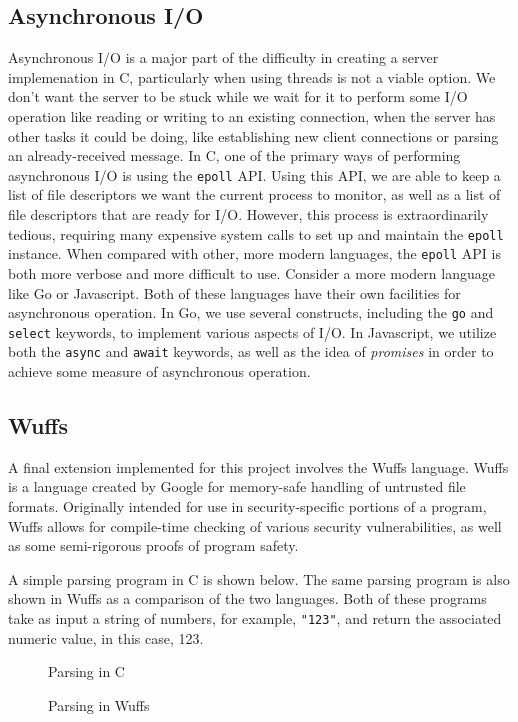 \documentclass[main.tex]{subfiles}
\begin{document}
\subsection{Asynchronous I/O}
Asynchronous I/O is a major part of the difficulty in creating a server
implemenation in C, particularly when using threads is not a viable option. We
don't want the server to be stuck while we wait for it to perform some I/O
operation like reading or writing to an existing connection, when the server has
other tasks it could be doing, like establishing new client connections or
parsing an already-received message. In C, one of the primary ways of performing
asynchronous I/O is using the \verb|epoll| API. Using this API, we are able to
keep a list of file descriptors we want the current process to monitor, as well
as a list of file descriptors that are ready for I/O. However, this process is
extraordinarily tedious, requiring many expensive system calls to set up and
maintain the \verb|epoll| instance. When compared with other, more modern
languages, the \verb|epoll| API is both more verbose and more difficult to use.
Consider a more modern language like Go or Javascript. Both of these languages
have their own facilities for asynchronous operation. In Go, we use several
constructs, including the \verb|go| and \verb|select| keywords, to implement
various aspects of I/O. In Javascript, we utilize both the \verb|async| and
\verb|await| keywords, as well as the idea of \emph{promises} in order to
achieve some measure of asynchronous operation.

\subsection{Wuffs}
A final extension implemented for this project involves the Wuffs language.
Wuffs is a language created by Google for memory-safe handling of untrusted file
formats. Originally intended for use in security-specific portions of a program,
Wuffs allows for compile-time checking of various security vulnerabilities, as
well as some semi-rigorous proofs of program safety.

A simple parsing program in C is shown below. The same parsing program is also
shown in Wuffs as a comparison of the two languages. Both of these programs take
as input a string of numbers, for example, \verb|"123"|, and return the
associated numeric value, in this case, 123.

\begin{singlespace}
    \begin{figure}[p!]
        \caption{Parsing in C}
        
    \end{figure}
    \begin{figure}[p!]
        \caption{Parsing in Wuffs}
        
    \end{figure}
\end{singlespace}
\end{document}
